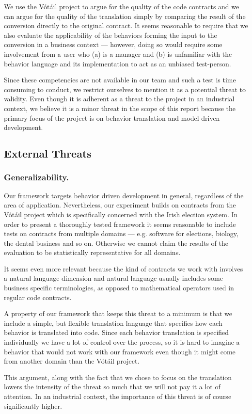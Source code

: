 We use the V\'{o}t\'{a}il project to argue for the quality of the code contracts and we can argue for the quality of the translation simply by comparing the result of the conversion directly to the original contract.
It seems reasonable to require that we also evaluate the applicability of the behaviors forming the input to the conversion in a business context --- however, doing so would require some involvement from a user who (a) is a manager and (b) is unfamiliar with the behavior language and its implementation to act as an unbiased test-person.

Since these competencies are not available in our team and such a test is time consuming to conduct, we restrict ourselves to mention it as a potential threat to validity.
Even though it is adherent as a threat to the project in an industrial context, we believe it is a minor threat in the scope of this report because the primary focus of the project is on behavior translation and model driven development.

\subsection{External Threats}
\subsubsection{Generalizability.}
Our framework targets behavior driven development in general, regardless of the area of application.
Nevertheless, our experiment builds on contracts from the V\'{o}t\'{a}il project which is specifically concerned with the Irish election system.
In order to present a thoroughly tested framework it seems reasonable to include tests on contracts from multiple domains --- e.g. software for elections, biology, the dental business and so on.
Otherwise we cannot claim the results of the evaluation to be statistically representative for all domains.
 
It seems even more relevant because the kind of contracts we work with involves a natural language dimension and natural language usually includes some business specific terminologies, as opposed to mathematical operators used in regular code contracts.
 
A property of our framework that keeps this threat to a minimum is that we include a simple, but flexible translation language that specifies how each behavior is translated into code.
Since each behavior translation is specified individually we have a lot of control over the process, so it is hard to imagine a behavior that would not work with our framework even though it might come from another domain than the V\'{o}t\'{a}il project.
 
This argument, along with the fact that we chose to focus on the translation lowers the intensity of the threat so much that we will not pay it a lot of attention.
In an industrial context, the importance of this threat is of course significantly higher.

